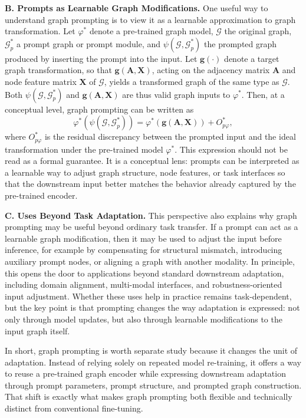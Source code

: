 \textbf{B. Prompts as Learnable Graph Modifications.}
One useful way to understand graph prompting is to view it as a learnable approximation to graph transformation. Let $\varphi^*$ denote a pre-trained graph model, $\mathcal{G}$ the original graph, $\mathcal{G}_p^*$ a prompt graph or prompt module, and $\psi(\mathcal{G}, \mathcal{G}_p^*)$ the prompted graph produced by inserting the prompt into the input. Let $\mathbf{g}(\cdot)$ denote a target graph transformation, so that $\mathbf{g}(\mathbf{A}, \mathbf{X})$, acting on the adjacency matrix $\mathbf{A}$ and node feature matrix $\mathbf{X}$ of $\mathcal{G}$, yields a transformed graph of the same type as $\mathcal{G}$. Both $\psi(\mathcal{G}, \mathcal{G}_p^*)$ and $\mathbf{g}(\mathbf{A}, \mathbf{X})$ are thus valid graph inputs to $\varphi^*$. Then, at a conceptual level, graph prompting can be written as
\begin{equation}\label{equ:error_bound_new}%
    \varphi^*\left(\psi(\mathcal{G}, \mathcal{G}_p^*)\right)=\varphi^*(\mathbf{g}(\mathbf{A}, \mathbf{X})) + O^{*}_{p\varphi},
\end{equation}
where $O^{*}_{p\varphi}$ is the residual discrepancy between the prompted input and the ideal transformation under the pre-trained model $\varphi^*$. This expression should not be read as a formal guarantee. It is a conceptual lens: prompts can be interpreted as a learnable way to adjust graph structure, node features, or task interfaces so that the downstream input better matches the behavior already captured by the pre-trained encoder.


\textbf{C. Uses Beyond Task Adaptation.}
This perspective also explains why graph prompting may be useful beyond ordinary task transfer. If a prompt can act as a learnable graph modification, then it may be used to adjust the input before inference, for example by compensating for structural mismatch, introducing auxiliary prompt nodes, or aligning a graph with another modality. In principle, this opens the door to applications beyond standard downstream adaptation, including domain alignment, multi-modal interfaces, and robustness-oriented input adjustment. Whether these uses help in practice remains task-dependent, but the key point is that prompting changes the way adaptation is expressed: not only through model updates, but also through learnable modifications to the input graph itself.

In short, graph prompting is worth separate study because it changes the unit of adaptation. Instead of relying solely on repeated model re-training, it offers a way to reuse a pre-trained graph encoder while expressing downstream adaptation through prompt parameters, prompt structure, and prompted graph construction. That shift is exactly what makes graph prompting both flexible and technically distinct from conventional fine-tuning.
